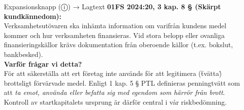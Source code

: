 \documentclass[10pt]{beamer}
\begin{document}
\begin{frame}[label=riskfragor-steg4]
\begin{alertblock}{Expansionsknapp (ⓘ) → Lagtext}
    \tiny \textbf{01FS 2024:20, 3 kap. 8 § (Skärpt kundkännedom):}\\
    \tiny Verksamhetsutövaren ska inhämta information om varifrån kundens medel kommer och hur verksamheten finansieras.
    Vid stora belopp eller ovanliga finansieringskällor krävs dokumentation från oberoende källor (t.ex. bokslut, bankbesked).\\[0.1cm]
    
    \tiny \textbf{Varför frågar vi detta?}\\
    \tiny För att säkerställa att ert företag inte används för att legitimera (\"tvätta\") brottsligt förvärvade medel.
    Enligt 1 kap. 5 § PTL definieras penningtvätt som att \emph{ta emot, använda eller befatta sig med egendom
    som härrör från brott}. Kontroll av startkapitalets ursprung är därför central i vår riskbedömning.
  \end{alertblock}

  \vspace{0.5cm}
  \begin{flushright}
    \hyperlink{riskfragor-steg3}{} \hspace{0.3cm} \hyperlink{riskfragor-steg4-fortsattning}{}
  \end{flushright}
\end{frame}

\end{document}
